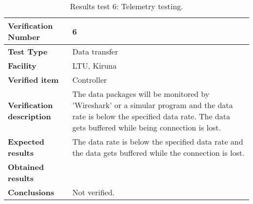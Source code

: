 \begin{table}[H]
\centering

\begin{tabular}{|m{}| m{} |}
\hline
\textbf{Verification Number} 		& 6 				\\ \hline
\textbf{Test Type} 					& Data transfer 	\\ \hline
\textbf{Facility} 					& LTU, Kiruna 		\\ \hline
\textbf{Verified item} 				& Controller 		\\ \hline

\textbf{Verification description} 	& The data packages will be monitored by 'Wireshark' or a simular program and the data rate is below the specified data rate. The data gets buffered while being connection is lost. \\ \hline

\textbf{Expected results} 			& The data rate is below the specified data rate and the data gets buffered while the connection is lost. \\ \hline

\textbf{Obtained results} 			& \\ \hline

\textbf{Conclusions} 				& Not verified.		\\ \hline
\end{tabular}
\caption{Results test 6: Telemetry testing.}
\label{tab:testresult6:telemetry}
\end{table}


\raggedbottom
